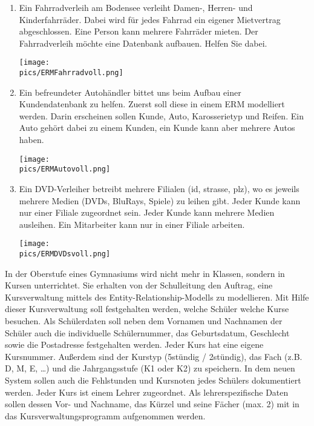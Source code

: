 \begin{Answer}[ref=ERMErstellen2]
	\begin{enumerate}
		\item Ein Fahrradverleih am Bodensee verleiht Damen-, Herren- und Kinderfahrräder. Dabei wird für jedes Fahrrad ein eigener Mietvertrag abgeschlossen. Eine Person kann mehrere Fahrräder mieten. Der Fahrradverleih möchte eine Datenbank aufbauen. Helfen Sie dabei.

		\begin{minipage}{0.8\textwidth}
			\centering\texttt{[image: \\pics/ERMFahrradvoll.png]}
		\end{minipage}
		\item Ein befreundeter Autohändler bittet uns beim Aufbau einer Kundendatenbank zu helfen. Zuerst soll diese in einem ERM modelliert werden. Darin erscheinen sollen Kunde, Auto, Karosserietyp und Reifen. Ein Auto gehört dabei zu einem Kunden, ein Kunde kann aber mehrere Autos haben.

		\begin{minipage}{0.8\textwidth}
			\centering\texttt{[image: \\pics/ERMAutovoll.png]}
		\end{minipage}
		\item Ein DVD-Verleiher betreibt mehrere Filialen (id, strasse, plz), wo es jeweils mehrere Medien (DVDs, BluRays, Spiele) zu leihen gibt. Jeder Kunde kann nur einer Filiale zugeordnet sein. Jeder Kunde kann mehrere Medien ausleihen. Ein Mitarbeiter kann nur in einer Filiale arbeiten.

		\begin{minipage}{0.8\textwidth}
			\centering\texttt{[image: \\pics/ERMDVDsvoll.png]}
		\end{minipage}
	\end{enumerate}
\end{Answer}
\newpage
\begin{Exercise}[title=Erstelle ein ERM., label=ERMErstellen3]

	In der Oberstufe eines Gymnasiums wird nicht mehr in Klassen, sondern in Kursen unterrichtet. Sie erhalten von der Schulleitung den Auftrag, eine Kursverwaltung mittels des Entity-Relationship-Modells zu modellieren. Mit Hilfe dieser Kursverwaltung soll festgehalten werden, welche Schüler welche Kurse besuchen. Als Schülerdaten soll neben dem Vornamen und Nachnamen der Schüler auch die individuelle Schülernummer, das Geburtsdatum, Geschlecht sowie die Postadresse festgehalten	werden. Jeder Kurs hat eine eigene Kursnummer. Außerdem sind der Kurstyp (5stündig / 2stündig), das Fach (z.B. D, M, E, …) und die Jahrgangsstufe (K1 oder K2) zu speichern. In dem neuen System sollen auch die Fehlstunden und Kursnoten jedes Schülers dokumentiert werden. Jeder Kurs ist einem Lehrer zugeordnet. Als lehrerspezifische Daten sollen dessen Vor- und Nachname, das Kürzel und seine Fächer (max. 2) mit in das Kursverwaltungsprogramm aufgenommen werden.
\end{Exercise}

